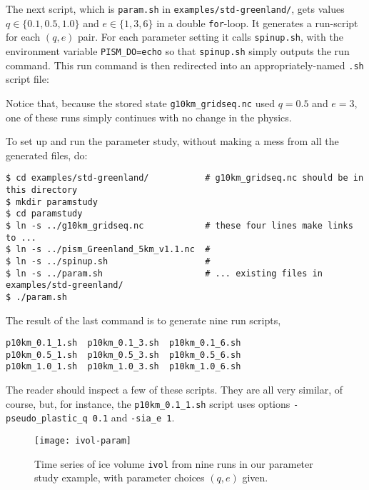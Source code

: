The next script, which is \texttt{param.sh} in \texttt{examples/std-greenland/}, gets values $q\in\{0.1,0.5,1.0\}$ and $e\in\{1,3,6\}$ in a double \texttt{for}-loop.  It generates a run-script for each $(q,e)$ pair.  For each parameter setting it calls \texttt{spinup.sh}, with the environment variable \texttt{PISM_DO=echo} so that \texttt{spinup.sh} simply outputs the run command.  This run command is then redirected into an appropriately-named \texttt{.sh} script file:
Notice that, because the stored state \texttt{g10km_gridseq.nc} used $q=0.5$ and $e=3$, one of these runs simply  continues with no change in the physics.

To set up and run the parameter study, without making a mess from all the generated files, do:
\small
\begin{verbatim}
$ cd examples/std-greenland/           # g10km_gridseq.nc should be in this directory
$ mkdir paramstudy
$ cd paramstudy
$ ln -s ../g10km_gridseq.nc            # these four lines make links to ...
$ ln -s ../pism_Greenland_5km_v1.1.nc  #
$ ln -s ../spinup.sh                   #
$ ln -s ../param.sh                    # ... existing files in examples/std-greenland/
$ ./param.sh
\end{verbatim}
\normalsize
The result of the last command is to generate nine run scripts,
\small
\begin{verbatim}
p10km_0.1_1.sh  p10km_0.1_3.sh  p10km_0.1_6.sh
p10km_0.5_1.sh  p10km_0.5_3.sh  p10km_0.5_6.sh
p10km_1.0_1.sh  p10km_1.0_3.sh  p10km_1.0_6.sh
\end{verbatim}
\normalsize
The reader should inspect a few of these scripts.  They are all very similar, of course, but, for instance, the \texttt{p10km_0.1_1.sh} script uses options \texttt{-pseudo_plastic_q 0.1} and \texttt{-sia_e 1}.

\begin{figure}[ht]
\centering
\texttt{[image: ivol-param]}

\caption{Time series of ice volume \texttt{ivol} from nine runs in our parameter study example, with parameter choices $(q,e)$ given.}
\label{fig:ivolparamstudy}
\end{figure}

